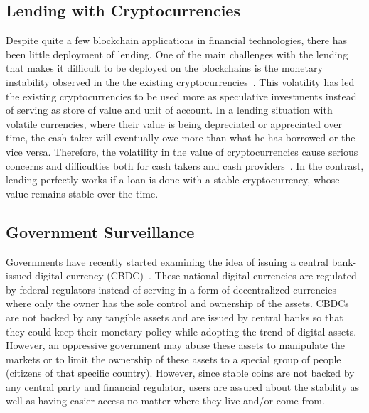 \subsection{Lending with Cryptocurrencies}
Despite quite a few blockchain applications in financial technologies, there has been little deployment of lending. One of the main challenges with the lending that makes it difficult to be deployed on the blockchains is the monetary instability observed in the the existing cryptocurrencies~\cite{okoyetoward}. This volatility has led the existing cryptocurrencies to be used more as speculative investments instead of serving as store of value and unit of account. In a lending situation with volatile currencies, where their value is being depreciated or appreciated over time, the cash taker will eventually owe more than what he has borrowed or the vice versa. Therefore, the volatility in the value of cryptocurrencies cause serious concerns and difficulties both for cash takers and cash providers~\cite{okoyetoward}. In the contrast, lending perfectly works if a loan is done with a stable cryptocurrency, whose value remains stable over the time.

\subsection{Government Surveillance}

Governments have recently started examining  the idea of issuing a central bank-issued digital currency (CBDC)~\cite{barrdear2016macroeconomics}. These national digital currencies are regulated by federal regulators instead of serving in a form of decentralized currencies-- where only the owner has the sole control and ownership of the assets. CBDCs are not backed by any tangible assets and are issued by central banks so that they could keep their monetary policy while adopting the trend of digital assets. However, an oppressive government may abuse these assets to manipulate the markets or to limit the ownership of these assets to  a special group of people (\eg citizens of that specific country). However, since stable coins are not backed by any central party and financial regulator, users are assured about the stability as well as having easier access no matter where they live and/or come from.



